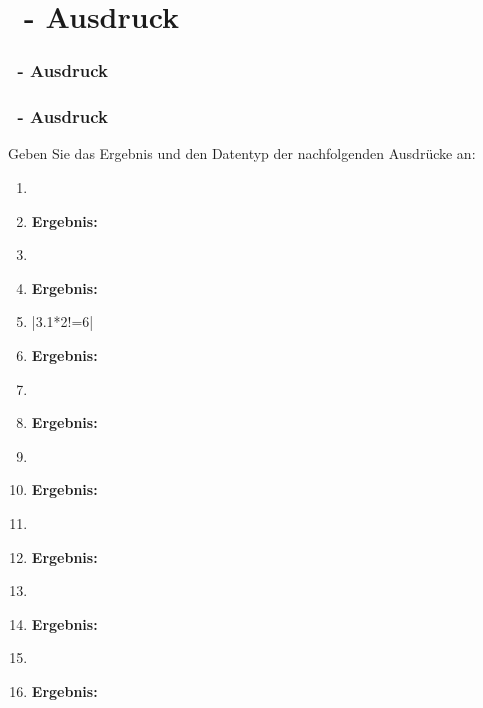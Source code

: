 \def\stitle{\theexercise\ - Ausdruck}
\section{\stitle}
\begin{frame}
  \frametitle{\stitle}%
\tableofcontents[current]
\end{frame}

\begin{frame}[t]%
    \frametitle{\stitle}
Geben Sie das Ergebnis und den Datentyp der nachfolgenden Ausdr\"ucke an:
\begin{enumerate}
\item {}
\item[] {\bf Ergebnis: }  \dotfill

\item {}
\item[] {\bf Ergebnis: }  \dotfill

\item \code|3.1*2!=6|
\item[] {\bf Ergebnis: }  \dotfill

\item {}
\item[] {\bf Ergebnis: }  \dotfill

\item {}
\item[] {\bf Ergebnis: }  \dotfill

\item {}
\item[] {\bf Ergebnis: }  \dotfill

\item {}
\item[] {\bf Ergebnis: }  \dotfill

\item {}
\item[] {\bf Ergebnis: }  \dotfill
\end{enumerate}
\end{frame}



